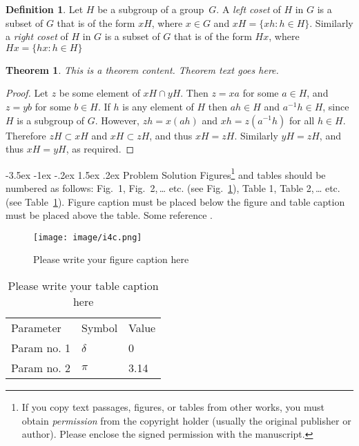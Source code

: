 \documentclass[a4paper,10pt]{article}
\makeatletter
\newtheorem*{theorem}{Theorem}
\theoremstyle{definition}
\newtheorem*{definition}{Definition}
\renewcommand\section{\@startsection {section}{1}{\z@}%
                                   {-3.5ex \@plus -1ex \@minus -.2ex}%
                                   {1.5ex \@plus.2ex}%
                                   {\large\bfseries}}
\makeatother
\begin{document}
\begin{definition}
Let $H$ be a subgroup of a group~$G$.  A \emph{left coset}
of $H$ in $G$ is a subset of $G$ that is of the form $xH$,
where $x \in G$ and $xH = \{ xh : h \in H \}$.
Similarly a \emph{right coset} of $H$ in $G$ is a subset
of $G$ that is of the form $Hx$, where
$Hx = \{ hx : h \in H \}$
\end{definition}

\begin{theorem}
This is a theorem content. Theorem text goes here. 
\end{theorem}

\begin{proof}
Let $z$ be some element of $xH \cap yH$.  Then $z = xa$
for some $a \in H$, and $z = yb$ for some $b \in H$.
If $h$ is any element of $H$ then $ah \in H$ and
$a^{-1}h \in H$, since $H$ is a subgroup of $G$.
However, $zh = x(ah)$ and $xh = z(a^{-1}h)$ for all $h \in H$.
Therefore $zH \subset xH$ and $xH \subset zH$, and thus
$xH = zH$.  Similarly $yH = zH$, and thus $xH = yH$,
as required.
\end{proof}

\section{Problem Solution}
Figures\footnote{If you copy text passages, figures, or tables from other works, you must obtain \textit{permission} from the copyright holder (usually the original publisher or author). Please enclose the signed permission with the manuscript.} and tables should be numbered as follows: Fig.~1,
Fig.~2,\,\dots{} etc. (see Fig.~\ref{fig:1}), Table 1, Table 2,\,\dots{} etc. (see Table~\ref{tab:1}). Figure caption must be placed below the figure and table caption must be placed above the table. Some reference \cite{SICILIANO_rhandbook}.

%
%
\begin{figure}[h]
\begin{center}
\texttt{[image: image/i4c.png]}
\caption{Please write your figure caption here}
\label{fig:1}
\end{center}
\end{figure}


%
%
\begin{table}[h] 
\begin{center}
\caption{Please write your table caption here} 
\label{tab:1}
\begin{tabular}{lll}
\hline\noalign{\smallskip}
Parameter & Symbol & Value\\
\noalign{\smallskip}
\hline\noalign{\smallskip}
Param no. 1 & $\delta$ & 0\\
Param no. 2 & $\pi$    & 3.14\\
\hline
\end{tabular}
\end{center}
\end{table}
\end{document}
